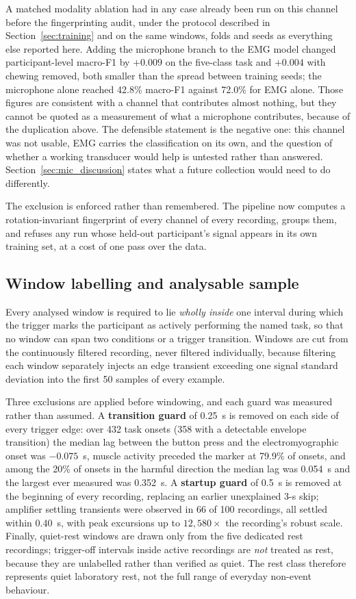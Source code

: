 \documentclass[pdflatex,sn-nature,iicol]{sn-jnl}
\begin{document}
A matched modality ablation had in any case already been run on this channel before the fingerprinting audit, under the protocol described in Section~\ref{sec:training} and on the same windows, folds and seeds as everything else reported here. Adding the microphone branch to the EMG model changed participant-level macro-F1 by $+0.009$ on the five-class task and $+0.004$ with chewing removed, both smaller than the spread between training seeds; the microphone alone reached 42.8\% macro-F1 against 72.0\% for EMG alone. Those figures are consistent with a channel that contributes almost nothing, but they cannot be quoted as a measurement of what a microphone contributes, because of the duplication above. The defensible statement is the negative one: this channel was not usable, EMG carries the classification on its own, and the question of whether a working transducer would help is untested rather than answered. Section~\ref{sec:mic_discussion} states what a future collection would need to do differently.

The exclusion is enforced rather than remembered. The pipeline now computes a rotation-invariant fingerprint of every channel of every recording, groups them, and refuses any run whose held-out participant's signal appears in its own training set, at a cost of one pass over the data.

\subsection{Window labelling and analysable sample}

Every analysed window is required to lie \emph{wholly inside} one interval during which the trigger marks the participant as actively performing the named task, so that no window can span two conditions or a trigger transition. Windows are cut from the continuously filtered recording, never filtered individually, because filtering each window separately injects an edge transient exceeding one signal standard deviation into the first 50 samples of every example.

Three exclusions are applied before windowing, and each guard was measured rather than assumed. A \textbf{transition guard} of 0.25~s is removed on each side of every trigger edge: over 432 task onsets (358 with a detectable envelope transition) the median lag between the button press and the electromyographic onset was $-0.075$~s, muscle activity preceded the marker at 79.9\% of onsets, and among the 20\% of onsets in the harmful direction the median lag was 0.054~s and the largest ever measured was 0.352~s. A \textbf{startup guard} of 0.5~s is removed at the beginning of every recording, replacing an earlier unexplained 3-s skip; amplifier settling transients were observed in 66 of 100 recordings, all settled within 0.40~s, with peak excursions up to $12{,}580\times$ the recording's robust scale. Finally, quiet-rest windows are drawn only from the five dedicated rest recordings; trigger-off intervals inside active recordings are \emph{not} treated as rest, because they are unlabelled rather than verified as quiet. The rest class therefore represents quiet laboratory rest, not the full range of everyday non-event behaviour.
\end{document}
